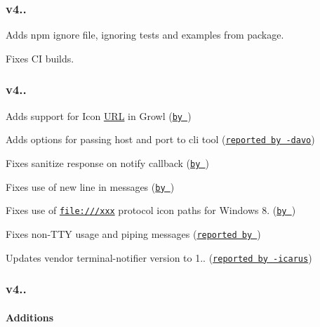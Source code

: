 \subsubsection*{{\ttfamily v4..}}


\begin{DoxyEnumerate}
\item Adds npm ignore file, ignoring tests and examples from package.
\item Fixes CI builds.
\end{DoxyEnumerate}

\subsubsection*{{\ttfamily v4..}}


\begin{DoxyEnumerate}
\item Adds support for Icon \mbox{\hyperlink{namespace_u_r_l}{U\+RL}} in Growl (\href{https://github.com/mikaelbr/node-notifier/pull/115}{\tt by })
\item Adds options for passing host and port to cli tool (\href{https://github.com/mikaelbr/node-notifier/issues/106}{\tt reported by -\/davo})
\item Fixes sanitize response on {\ttfamily notify} callback (\href{https://github.com/mikaelbr/node-notifier/commit/a44454a11eff452a8b55f9fbe291e189ed088708}{\tt by })
\item Fixes use of new line in messages (\href{https://github.com/mikaelbr/node-notifier/pull/115}{\tt by })
\item Fixes use of {\ttfamily \href{file:///xxx}{\tt file\+:///xxx}} protocol icon paths for Windows 8. (\href{https://github.com/mikaelbr/node-notifier/pull/118}{\tt by })
\item Fixes non-\/\+T\+TY usage and piping messages (\href{https://github.com/mikaelbr/node-notifier/issues/109}{\tt reported by })
\item Updates vendor terminal-\/notifier version to 1.. (\href{https://github.com/mikaelbr/node-notifier/pull/120}{\tt reported by -\/icarus})
\end{DoxyEnumerate}

\subsubsection*{{\ttfamily v4..}}

\paragraph*{Additions}


